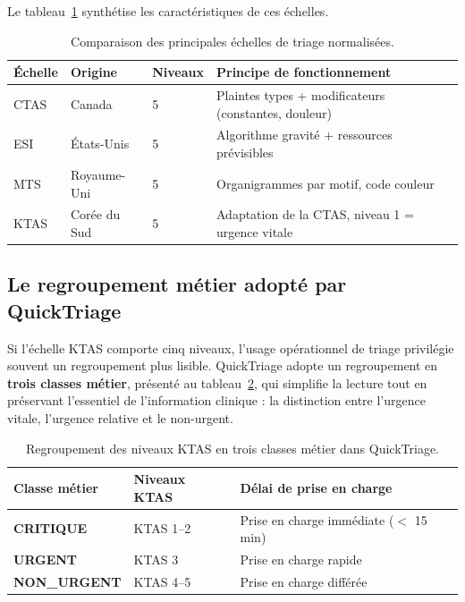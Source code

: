 Le tableau~\ref{tab:echelles} synthétise les caractéristiques de ces échelles.

\begin{table}[h]
\centering
\renewcommand{\arraystretch}{1.3}
\begin{tabular}{p{2.2cm} p{2.2cm} p{2cm} p{6.5cm}}
\toprule
\textbf{Échelle} & \textbf{Origine} & \textbf{Niveaux} & \textbf{Principe de fonctionnement} \\
\midrule
CTAS & Canada & 5 & Plaintes types + modificateurs (constantes, douleur) \\
ESI  & États-Unis & 5 & Algorithme gravité + ressources prévisibles \\
MTS  & Royaume-Uni & 5 & Organigrammes par motif, code couleur \\
KTAS & Corée du Sud & 5 & Adaptation de la CTAS, niveau 1 = urgence vitale \\
\bottomrule
\end{tabular}
\caption{Comparaison des principales échelles de triage normalisées.}
\label{tab:echelles}
\end{table}

\subsection{Le regroupement métier adopté par QuickTriage}
Si l'échelle KTAS comporte cinq niveaux, l'usage opérationnel de triage privilégie souvent
un regroupement plus lisible. QuickTriage adopte un regroupement en \textbf{trois classes
métier}, présenté au tableau~\ref{tab:classes}, qui simplifie la lecture tout en préservant
l'essentiel de l'information clinique : la distinction entre l'urgence vitale, l'urgence
relative et le non-urgent.

\begin{table}[h]
\centering
\renewcommand{\arraystretch}{1.4}
\begin{tabular}{p{3.2cm} p{2.5cm} p{6.5cm}}
\toprule
\textbf{Classe métier} & \textbf{Niveaux KTAS} & \textbf{Délai de prise en charge} \\
\midrule
\textcolor{qtcritique}{\textbf{CRITIQUE}}     & KTAS 1--2 & Prise en charge immédiate ($<$ 15 min) \\
\textcolor{qturgent}{\textbf{URGENT}}         & KTAS 3    & Prise en charge rapide \\
\textcolor{qtnonurgent}{\textbf{NON\_URGENT}} & KTAS 4--5 & Prise en charge différée \\
\bottomrule
\end{tabular}
\caption{Regroupement des niveaux KTAS en trois classes métier dans QuickTriage.}
\label{tab:classes}
\end{table}

